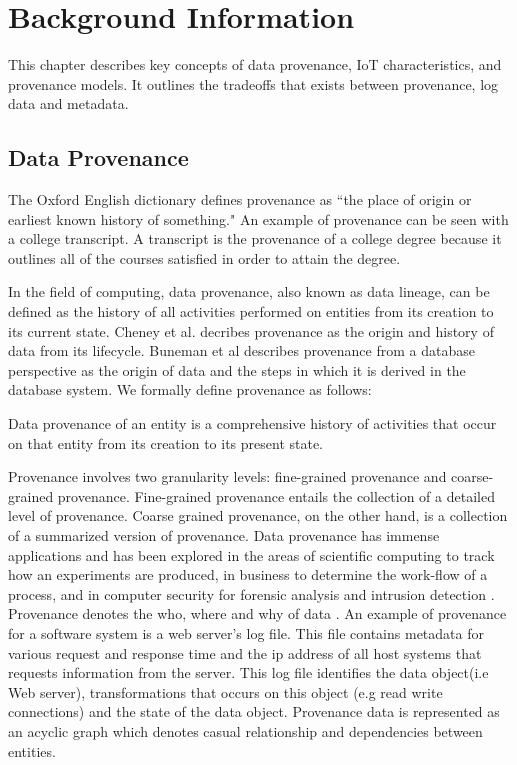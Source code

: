 \chapter{Background Information}

This chapter describes key concepts of data provenance, IoT characteristics, and provenance models. It outlines the tradeoffs that exists between provenance, log data and metadata. 

\section{Data Provenance}
The Oxford English dictionary defines provenance \cite{TCDP1999} as ``the place of origin or earliest known history of something."  An example of provenance can be seen with a college transcript. A transcript is the provenance of a college degree because it outlines all of the courses satisfied in order to attain the degree.
\par In the field of computing, data provenance, also known as  data lineage, can be defined as the history of all activities performed on entities from its creation to its current state. Cheney et al. \cite{cheney_provenance_2009} decribes provenance as the origin and history of data from its lifecycle. Buneman et al \cite{buneman_why_2001} describes provenance from a database perspective as the origin of data and the steps in which it is derived in the database system.  We formally define provenance as follows:


\begin{definition}

Data provenance of an entity is a comprehensive history of activities that occur on that entity from its creation to its present state.

\end{definition}

Provenance involves two granularity levels: fine-grained provenance and coarse-grained provenance. Fine-grained provenance \cite{glavic_case_2011} entails the collection of a detailed level of provenance. Coarse grained provenance, on the other hand, is a collection of a summarized version of provenance. Data provenance has immense applications and has been explored in the areas of scientific computing \cite{groth, altintas} to track how an experiments are produced, in business to determine the work-flow of  a process, and in computer security for forensic analysis and intrusion detection \cite{bates_towards_2013, muniswamy_reddy_provenance_2010, muniswamy_reddy} . Provenance denotes the who, where and why of data \cite{cheney_provenance_2009}. An example of provenance for a software system is a web server's log file. This file contains metadata for various request and response time and the ip address of all host systems that requests information from the server. This log file identifies the data object(i.e Web server), transformations that occurs on this object (e.g read write connections) and the state of the data object. Provenance data is represented as an acyclic graph which denotes casual relationship and dependencies between entities. 

